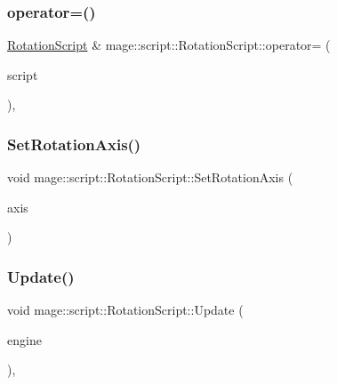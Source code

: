 \subsubsection{\texorpdfstring{operator=()}{operator=()}\hspace{0.1cm}{\footnotesize\ttfamily [2/2]}}
{\footnotesize\ttfamily \mbox{\hyperlink{classmage_1_1script_1_1_rotation_script}{Rotation\+Script}} \& mage\+::script\+::\+Rotation\+Script\+::operator= (\begin{DoxyParamCaption}\item[{\mbox{\hyperlink{classmage_1_1script_1_1_rotation_script}{Rotation\+Script}} \&\&}]{script }\end{DoxyParamCaption})\hspace{0.3cm}{\ttfamily [default]}, {\ttfamily [noexcept]}}

\mbox{\label{classmage_1_1script_1_1_rotation_script_aa4b49dc5e34da3e851d5aefc4c4a434b}} 
\subsubsection{\texorpdfstring{Set\+Rotation\+Axis()}{SetRotationAxis()}}
{\footnotesize\ttfamily void mage\+::script\+::\+Rotation\+Script\+::\+Set\+Rotation\+Axis (\begin{DoxyParamCaption}\item[{\mbox{\hyperlink{classmage_1_1script_1_1_rotation_script_a54e1d1d0af65f43f5bc5ad65a4b9c00a}{Rotation\+Axis}}}]{axis }\end{DoxyParamCaption})\hspace{0.3cm}{\ttfamily [noexcept]}}

\mbox{\label{classmage_1_1script_1_1_rotation_script_af4e83590b78094186b0dd107a58c7b3a}} 
\subsubsection{\texorpdfstring{Update()}{Update()}}
{\footnotesize\ttfamily void mage\+::script\+::\+Rotation\+Script\+::\+Update (\begin{DoxyParamCaption}\item[{\mbox{[}\mbox{[}maybe\+\_\+unused\mbox{]} \mbox{]} \mbox{\hyperlink{classmage_1_1_engine}{Engine}} \&}]{engine }\end{DoxyParamCaption})\hspace{0.3cm}{\ttfamily [override]}, {\ttfamily [virtual]}}


